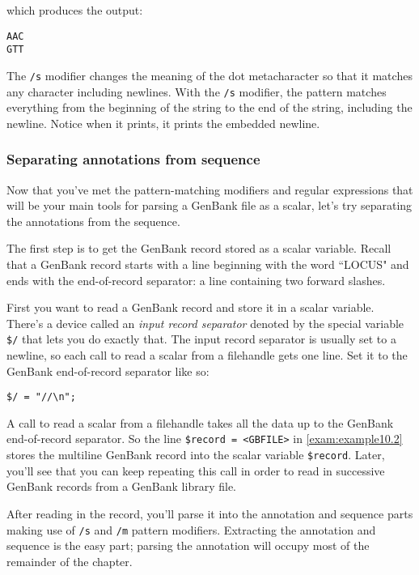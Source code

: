 which produces the output:

\begin{lstlisting}
AAC
GTT
\end{lstlisting}

The \verb|/s| modifier changes the meaning of the dot metacharacter so that it matches any character including newlines. With the \verb|/s| modifier, the pattern matches everything from the beginning of the string to the end of the string, including the newline. Notice when it prints, it prints the embedded newline.

\subsubsection{Separating annotations from sequence}
Now that you've met the pattern-matching modifiers and regular expressions that will be your main tools for parsing a GenBank file as a scalar, let's try separating the annotations from the sequence.

The first step is to get the GenBank record stored as a scalar variable. Recall that a GenBank record starts with a line beginning with the word ``LOCUS" and ends with the end-of-record separator: a line containing two forward slashes.

First you want to read a GenBank record and store it in a scalar variable. There's a device called an \textit{input record separator} denoted by the special variable \verb|$/| that lets you do exactly that. The input record separator is usually set to a newline, so each call to read a scalar from a filehandle gets one line. Set it to the GenBank end-of-record separator like so:

\begin{lstlisting}
$/ = "//\n";
\end{lstlisting}

A call to read a scalar from a filehandle takes all the data up to the GenBank end-of-record separator. So the line \verb|$record = <GBFILE>| in \autoref{exam:example10.2} stores the multiline GenBank record into the scalar variable \verb|$record|. Later, you'll see that you can keep repeating this call in order to read in successive GenBank records from a GenBank library file.

After reading in the record, you'll parse it into the annotation and sequence parts making use of \verb|/s| and \verb|/m| pattern modifiers. Extracting the annotation and sequence is the easy part; parsing the annotation will occupy most of the remainder of the chapter.

